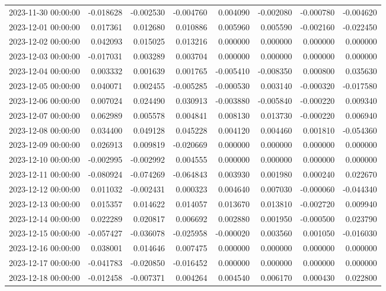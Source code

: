 \begin{tabular}{lrrrrrrr}
2023-11-30 00:00:00 & -0.018628 & -0.002530 & -0.004760 & 0.004090 & -0.002080 & -0.000780 & -0.004620 \\
2023-12-01 00:00:00 & 0.017361 & 0.012680 & 0.010886 & 0.005960 & 0.005590 & -0.002160 & -0.022450 \\
2023-12-02 00:00:00 & 0.042093 & 0.015025 & 0.013216 & 0.000000 & 0.000000 & 0.000000 & 0.000000 \\
2023-12-03 00:00:00 & -0.017031 & 0.003289 & 0.003704 & 0.000000 & 0.000000 & 0.000000 & 0.000000 \\
2023-12-04 00:00:00 & 0.003332 & 0.001639 & 0.001765 & -0.005410 & -0.008350 & 0.000800 & 0.035630 \\
2023-12-05 00:00:00 & 0.040071 & 0.002455 & -0.005285 & -0.000530 & 0.003140 & -0.000320 & -0.017580 \\
2023-12-06 00:00:00 & 0.007024 & 0.024490 & 0.030913 & -0.003880 & -0.005840 & -0.000220 & 0.009340 \\
2023-12-07 00:00:00 & 0.062989 & 0.005578 & 0.004841 & 0.008130 & 0.013730 & -0.000220 & 0.006940 \\
2023-12-08 00:00:00 & 0.034400 & 0.049128 & 0.045228 & 0.004120 & 0.004460 & 0.001810 & -0.054360 \\
2023-12-09 00:00:00 & 0.026913 & 0.009819 & -0.020669 & 0.000000 & 0.000000 & 0.000000 & 0.000000 \\
2023-12-10 00:00:00 & -0.002995 & -0.002992 & 0.004555 & 0.000000 & 0.000000 & 0.000000 & 0.000000 \\
2023-12-11 00:00:00 & -0.080924 & -0.074269 & -0.064843 & 0.003930 & 0.001980 & 0.000240 & 0.022670 \\
2023-12-12 00:00:00 & 0.011032 & -0.002431 & 0.000323 & 0.004640 & 0.007030 & -0.000060 & -0.044340 \\
2023-12-13 00:00:00 & 0.015357 & 0.014622 & 0.014057 & 0.013670 & 0.013810 & -0.002720 & 0.009940 \\
2023-12-14 00:00:00 & 0.022289 & 0.020817 & 0.006692 & 0.002880 & 0.001950 & -0.000500 & 0.023790 \\
2023-12-15 00:00:00 & -0.057427 & -0.036078 & -0.025958 & -0.000020 & 0.003560 & 0.001050 & -0.016030 \\
2023-12-16 00:00:00 & 0.038001 & 0.014646 & 0.007475 & 0.000000 & 0.000000 & 0.000000 & 0.000000 \\
2023-12-17 00:00:00 & -0.041783 & -0.020850 & -0.016452 & 0.000000 & 0.000000 & 0.000000 & 0.000000 \\
2023-12-18 00:00:00 & -0.012458 & -0.007371 & 0.004264 & 0.004540 & 0.006170 & 0.000430 & 0.022800 \\

\end{tabular}
